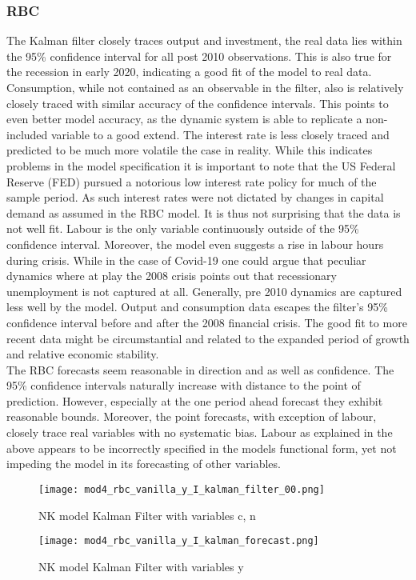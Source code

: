 \documentclass[12pt,a4paper,english]{article} %
\begin{document}
	\subsubsection{RBC}	
	The Kalman filter closely traces output and investment, the real data lies within the 95\% confidence interval for all post 2010 observations. This is also true for the recession in early 2020, indicating a good fit of the model to real data.
	Consumption, while not contained as an observable in the filter, also is relatively closely traced with similar accuracy of the confidence intervals. This points to even better model accuracy, as the dynamic system is able to replicate a non-included variable to a good extend. 	
	The interest rate is less closely traced and predicted to be much more volatile the case in reality. While this indicates problems in the model specification it is important to note that the US Federal Reserve (FED) pursued a notorious low interest rate policy for much of the sample period. As such interest rates were not dictated by changes in capital demand as assumed in the RBC model. It is thus not surprising that the data is not well fit.
	Labour is the only variable continuously outside of the 95\% confidence interval. Moreover, the model even suggests a rise in labour hours during crisis. While in the case of Covid-19 one could argue that peculiar dynamics where at play the 2008 crisis points out that recessionary unemployment is not captured at all. Generally, pre 2010 dynamics are captured less well by the model. Output and consumption data escapes the filter's 95\% confidence interval before and after the 2008 financial crisis. The good fit to more recent data might be circumstantial and related to the expanded period of growth and relative economic stability. \\
		
	The RBC forecasts seem reasonable in direction and as well as confidence. The 95\% confidence intervals naturally increase with distance to the point of prediction. However, especially at the one period ahead forecast they exhibit reasonable bounds. Moreover, the point forecasts, with exception of labour, closely trace real variables with no systematic bias. Labour as explained in the above appears to be incorrectly specified in the models functional form, yet not impeding the model in its forecasting of other variables. 
	
	\begin{figure}[H]
		\begin{center}
			\texttt{[image: mod4\_rbc\_vanilla\_y\_I\_kalman\_filter\_00.png]}
			\caption{NK model Kalman Filter with variables c, n}\label{fig:rbc_kfil}
			
			\texttt{[image: mod4\_rbc\_vanilla\_y\_I\_kalman\_forecast.png]}
			\caption{NK model Kalman Filter with variables y}\label{fig:rbc_kfor}
		\end{center}
	\end{figure}
	
\end{document}

